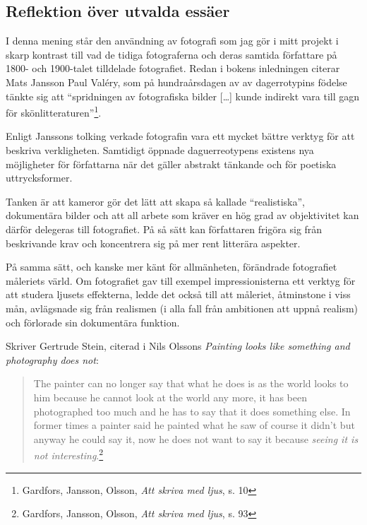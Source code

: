 \documentclass[
]{article}
\begin{document}
\hypertarget{reflektion-uxf6ver-utvalda-essuxe4er}{%
\subsection{Reflektion över utvalda
essäer}\label{reflektion-uxf6ver-utvalda-essuxe4er}}

I denna mening står den användning av fotografi som jag gör i mitt
projekt i skarp kontrast till vad de tidiga fotograferna och deras
samtida författare på 1800- och 1900-talet tilldelade fotografiet. Redan
i bokens inledningen citerar Mats Jansson Paul Valéry, som på
hundraårsdagen av av dagerrotypins födelse tänkte sig att ``spridningen
av fotografiska bilder {[}\ldots{]} kunde indirekt vara till gagn för
skönlitteraturen''\footnote{Gardfors, Jansson, Olsson, \textit{Att skriva med ljus}, s. 10}.

Enligt Janssons tolking verkade fotografin vara ett mycket bättre
verktyg för att beskriva verkligheten. Samtidigt öppnade daguerreotypens
existens nya möjligheter för författarna när det gäller abstrakt
tänkande och för poetiska uttrycksformer.

Tanken är att kameror gör det lätt att skapa så kallade ``realistiska'',
dokumentära bilder och att all arbete som kräver en hög grad av
objektivitet kan därför delegeras till fotografiet. På så sätt kan
författaren frigöra sig från beskrivande krav och koncentrera sig på mer
rent litterära aspekter.

På samma sätt, och kanske mer känt för allmänheten, förändrade
fotografiet måleriets värld. Om fotografiet gav till exempel
impressionisterna ett verktyg för att studera ljusets effekterna, ledde
det också till att måleriet, åtminstone i viss mån, avlägsnade sig från
realismen (i alla fall från ambitionen att uppnå realism) och förlorade
sin dokumentära funktion.

Skriver Gertrude Stein, citerad i Nils Olssons \emph{Painting looks like
something and photography does not}:

\begin{quote}
The painter can no longer say that what he does is as the world looks to
him because he cannot look at the world any more, it has been
photographed too much and he has to say that it does something else. In
former times a painter said he painted what he saw of course it didn't
but anyway he could say it, now he does not want to say it because
\emph{seeing it is not interesting}.\footnote{Gardfors, Jansson, Olsson, \textit{Att skriva med ljus}, s. 93}
\end{quote}
\end{document}
